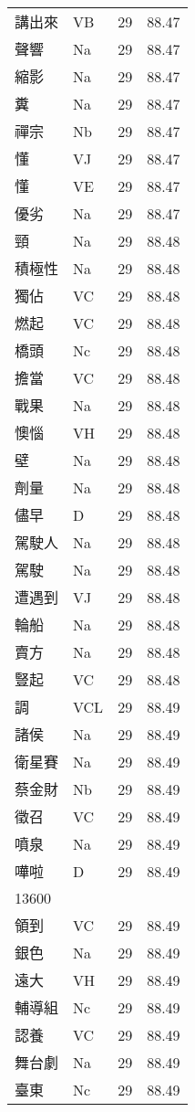 \documentclass[twocolumn]{book}
\begin{document}
\begin{supertabular}{llrr}
講出來 & VB & 29 &  88.47\\
聲響 & Na & 29 &  88.47\\
縮影 & Na & 29 &  88.47\\
糞 & Na & 29 &  88.47\\
禪宗 & Nb & 29 &  88.47\\
懂 & VJ & 29 &  88.47\\
懂 & VE & 29 &  88.47\\
優劣 & Na & 29 &  88.47\\
頸 & Na & 29 &  88.48\\
積極性 & Na & 29 &  88.48\\
獨佔 & VC & 29 &  88.48\\
燃起 & VC & 29 &  88.48\\
橋頭 & Nc & 29 &  88.48\\
擔當 & VC & 29 &  88.48\\
戰果 & Na & 29 &  88.48\\
懊惱 & VH & 29 &  88.48\\
壁 & Na & 29 &  88.48\\
劑量 & Na & 29 &  88.48\\
儘早 & D & 29 &  88.48\\
駕駛人 & Na & 29 &  88.48\\
駕駛 & Na & 29 &  88.48\\
遭遇到 & VJ & 29 &  88.48\\
輪船 & Na & 29 &  88.48\\
賣方 & Na & 29 &  88.48\\
豎起 & VC & 29 &  88.48\\
調 & VCL & 29 &  88.49\\
諸侯 & Na & 29 &  88.49\\
衛星賽 & Na & 29 &  88.49\\
蔡金財 & Nb & 29 &  88.49\\
徵召 & VC & 29 &  88.49\\
噴泉 & Na & 29 &  88.49\\
嘩啦 & D & 29 &  88.49\\
13600\\
領到 & VC & 29 &  88.49\\
銀色 & Na & 29 &  88.49\\
遠大 & VH & 29 &  88.49\\
輔導組 & Nc & 29 &  88.49\\
認養 & VC & 29 &  88.49\\
舞台劇 & Na & 29 &  88.49\\
臺東 & Nc & 29 &  88.49\\

\end{supertabular}
\end{document}
